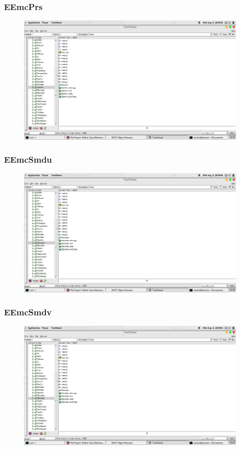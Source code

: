 \documentclass[10pt]{beamer}
\begin{document}
\label{EEmcPrs}
\begin{frame}
  \frametitle{EEmcPrs}
  \begin{figure}[hbtp]
    \centering
    \includegraphics[width=\textwidth]{EEmcPrs.png}
  \end{figure}
\end{frame}
\label{EEmcSmdu}
\begin{frame}
  \frametitle{EEmcSmdu}
  \begin{figure}[hbtp]
    \centering
    \includegraphics[width=\textwidth]{EEmcSmdu.png}
  \end{figure}
\end{frame}
\label{EEmcSmdv}
\begin{frame}
  \frametitle{EEmcSmdv}
  \begin{figure}[hbtp]
    \centering
    \includegraphics[width=\textwidth]{EEmcSmdv.png}
  \end{figure}
\end{frame}
\end{document}
